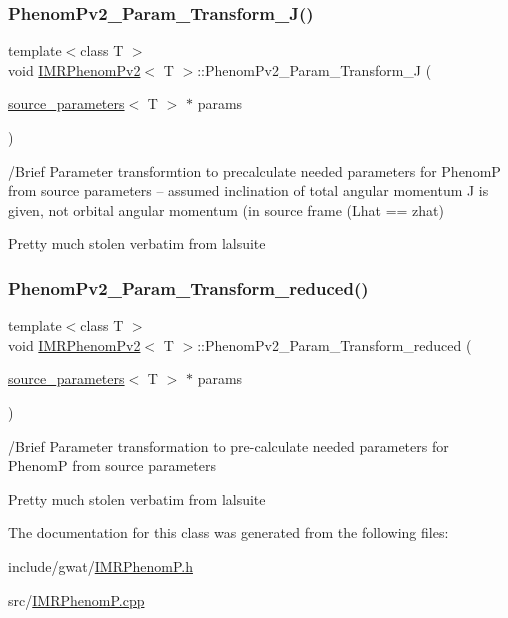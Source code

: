 \subsubsection{\texorpdfstring{Phenom\+Pv2\+\_\+\+Param\+\_\+\+Transform\+\_\+\+J()}{PhenomPv2\_Param\_Transform\_J()}}
{\footnotesize\ttfamily template$<$class T $>$ \\
void \hyperlink{classIMRPhenomPv2}{I\+M\+R\+Phenom\+Pv2}$<$ T $>$\+::Phenom\+Pv2\+\_\+\+Param\+\_\+\+Transform\+\_\+J (\begin{DoxyParamCaption}\item[{\hyperlink{structsource__parameters}{source\+\_\+parameters}$<$ T $>$ $\ast$}]{params }\end{DoxyParamCaption})\hspace{0.3cm}{\ttfamily [virtual]}}

/\+Brief Parameter transformtion to precalculate needed parameters for PhenomP from source parameters -- assumed inclination of total angular momentum J is given, not orbital angular momentum (in source frame (Lhat == zhat)

Pretty much stolen verbatim from lalsuite \mbox{\label{classIMRPhenomPv2_a09917aef3521bd8e3b8d8516930077a0}} 
\subsubsection{\texorpdfstring{Phenom\+Pv2\+\_\+\+Param\+\_\+\+Transform\+\_\+reduced()}{PhenomPv2\_Param\_Transform\_reduced()}}
{\footnotesize\ttfamily template$<$class T $>$ \\
void \hyperlink{classIMRPhenomPv2}{I\+M\+R\+Phenom\+Pv2}$<$ T $>$\+::Phenom\+Pv2\+\_\+\+Param\+\_\+\+Transform\+\_\+reduced (\begin{DoxyParamCaption}\item[{\hyperlink{structsource__parameters}{source\+\_\+parameters}$<$ T $>$ $\ast$}]{params }\end{DoxyParamCaption})\hspace{0.3cm}{\ttfamily [virtual]}}

/\+Brief Parameter transformation to pre-\/calculate needed parameters for PhenomP from source parameters

Pretty much stolen verbatim from lalsuite 

The documentation for this class was generated from the following files\+:\begin{DoxyCompactItemize}
\item 
include/gwat/\hyperlink{IMRPhenomP_8h}{I\+M\+R\+Phenom\+P.\+h}\item 
src/\hyperlink{IMRPhenomP_8cpp}{I\+M\+R\+Phenom\+P.\+cpp}\end{DoxyCompactItemize}

